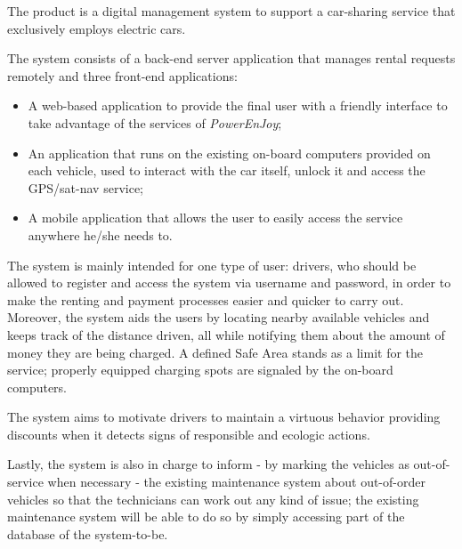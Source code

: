 The product is a digital management system to support a car-sharing service that exclusively employs electric cars.

The system consists of a back-end server application that manages rental requests remotely and three front-end applications:

\begin{itemize}
\item A web-based application to provide the final user with a friendly interface to take advantage of the services of \hbox{\emph{PowerEnJoy}};
\item An application that runs on the existing on-board computers provided on each vehicle, used to interact with the car itself, unlock it and access the GPS/sat-nav service;
\item A mobile application that allows the user to easily access the service anywhere he/she needs to.
\end{itemize}
The system is mainly intended for one type of user: drivers, who should be allowed to register and access the system via username and password, in order to make the renting and payment processes easier and quicker to carry out. Moreover, the system aids the users by locating nearby available vehicles and keeps track of the distance driven, all while notifying them about the amount of money they are being charged. A defined Safe Area stands as a limit for the service; properly equipped charging spots are signaled by the on-board computers.

The system aims to motivate drivers to maintain a virtuous behavior providing discounts when it detects signs of responsible and ecologic actions.

Lastly, the system is also in charge to inform - by marking the vehicles as out-of-service when necessary - the existing maintenance system about out-of-order vehicles so that the technicians can work out any kind of issue; the existing maintenance system will be able to do so by simply accessing part of the database of the system-to-be.